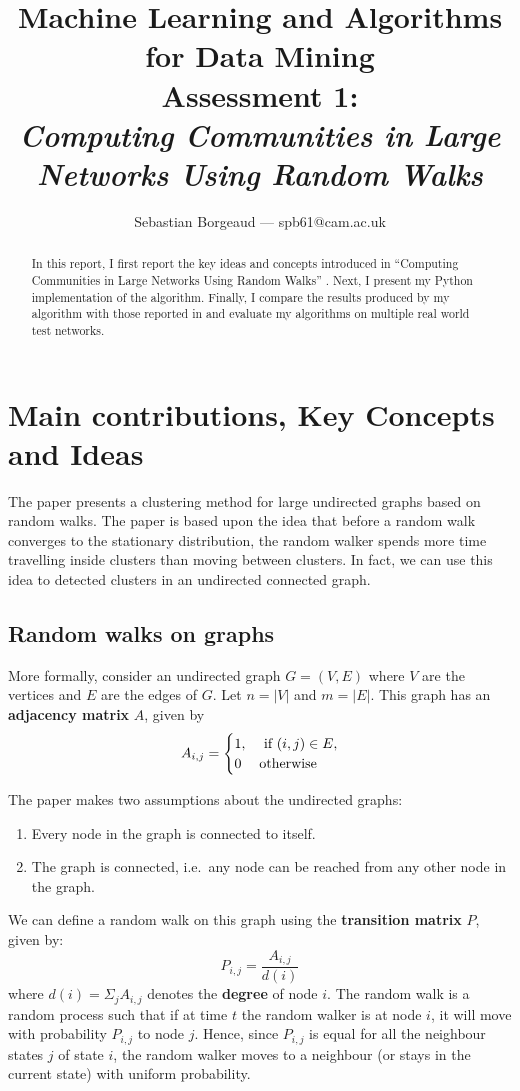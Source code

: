 \documentclass[12pt]{article}
\title{{\small{Machine Learning and Algorithms for Data Mining} \\
Assessment 1:} \\
\textit{Computing Communities in Large Networks Using Random Walks}}
\author{Sebastian Borgeaud --- spb61@cam.ac.uk}
\theoremstyle{definition}
\begin{document}
\maketitle

\begin{abstract}
	In this report, I first report the key ideas and concepts introduced in ``Computing Communities in Large Networks Using Random Walks'' \cite{pons2005computing}. Next, I present my Python implementation of the algorithm. Finally, I compare the results produced by my algorithm with those reported in \cite{pons2005computing} and evaluate my algorithms on multiple real world test networks.
	\end{abstract}

\section{Main contributions, Key Concepts and Ideas}
The paper presents a clustering method for large undirected graphs based on random walks. The paper is based upon the idea that before a random walk converges to the stationary distribution, the random walker spends more time travelling inside clusters than moving between clusters. In fact, we can use this idea to detected clusters in an undirected connected graph.

\subsection{Random walks on graphs}
More formally, consider an undirected graph $G=(V,E)$ where $V$ are the vertices and $E$ are the edges of $G$. Let $n = |V|$ and $m = |E|$. This graph has an \textbf{adjacency matrix} $A$, given by
\[ 
A_{i,j} = 
\begin{cases}
	1, 	&\textnormal{ if $(i,j) \in E$},\\
	0	&\textnormal{otherwise}\\
\end{cases}
\]

The paper makes two assumptions about the undirected graphs:
\begin{enumerate}
	\item Every node in the graph is connected to itself.
	\item The graph is connected, i.e.\ any node can be reached from any other node in the graph.
\end{enumerate}

We can define a random walk on this graph using the \textbf{transition matrix} $P$, given by:
\begin{equation}
	P_{i,j} = \frac{A_{i,j}}{d(i)}
\end{equation}
where $d(i) = \Sigma_j A_{i,j}$ denotes the \textbf{degree} of node $i$. The random walk is a random process such that if at time $t$ the random walker is at node $i$, it will move with probability $P_{i,j}$ to node $j$. Hence, since $P_{i,j}$ is equal for all the neighbour states $j$ of state $i$, the random walker moves to a neighbour (or stays in the current state) with uniform probability.
\end{document}
